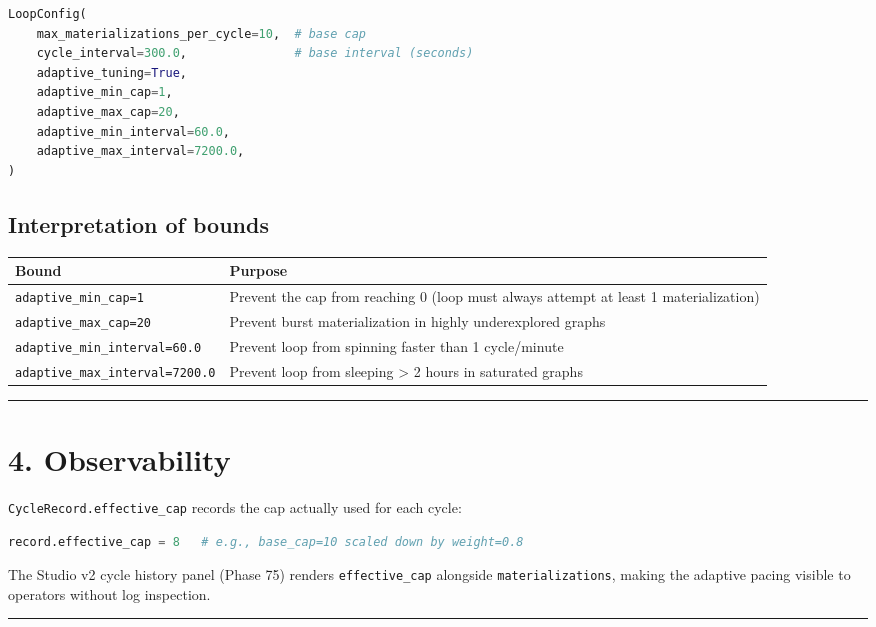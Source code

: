 \begin{lstlisting}[language=Python]
LoopConfig(
    max_materializations_per_cycle=10,  # base cap
    cycle_interval=300.0,               # base interval (seconds)
    adaptive_tuning=True,
    adaptive_min_cap=1,
    adaptive_max_cap=20,
    adaptive_min_interval=60.0,
    adaptive_max_interval=7200.0,
)
\end{lstlisting}

\subsection*{Interpretation of bounds}

\begin{table}[h]
\small\centering
\begin{tabular}{ll}
\toprule
Bound & Purpose \\
\midrule
\texttt{adaptive\_min\_cap=1} & Prevent the cap from reaching 0 (loop must always attempt at least 1 materialization) \\
\texttt{adaptive\_max\_cap=20} & Prevent burst materialization in highly underexplored graphs \\
\texttt{adaptive\_min\_interval=60.0} & Prevent loop from spinning faster than 1 cycle/minute \\
\texttt{adaptive\_max\_interval=7200.0} & Prevent loop from sleeping > 2 hours in saturated graphs \\
\bottomrule
\end{tabular}
\end{table}


\medskip\noindent\rule{\linewidth}{0.4pt}\medskip

\section*{4. Observability}

\texttt{CycleRecord.effective\_cap} records the cap actually used for each cycle:

\begin{lstlisting}[language=Python]
record.effective_cap = 8   # e.g., base_cap=10 scaled down by weight=0.8
\end{lstlisting}

The Studio v2 cycle history panel (Phase 75) renders \texttt{effective\_cap} alongside \texttt{materializations}, making the adaptive pacing visible to operators without log inspection.

\medskip\noindent\rule{\linewidth}{0.4pt}\medskip

